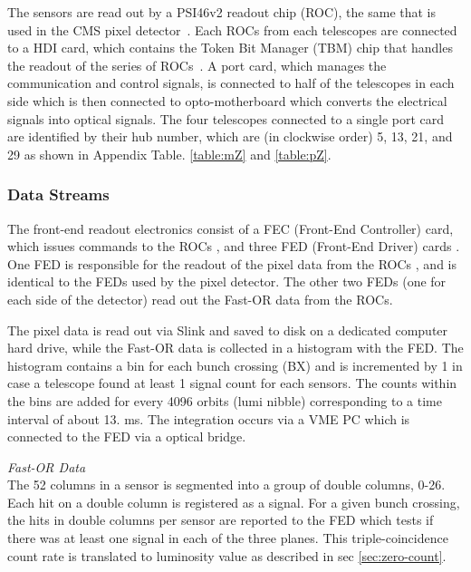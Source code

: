 The sensors are read out by a PSI46v2 readout chip (ROC), the same that is used in the CMS pixel detector~\cite{Kastli:2005jj, ROCManual, Barbero:467141}. Each ROCs from each telescopes are connected to a HDI card, which contains the Token Bit Manager (TBM) chip that handles the readout of the series of ROCs~\cite{BartzTBM}. A port card, which manages the communication and control signals, is connected to half of the telescopes in each side which is then connected to opto-motherboard which converts the electrical signals into optical signals. The four telescopes connected to a single port card are identified by their hub number, which are (in clockwise order) 5, 13, 21, and 29 as shown in Appendix Table. \ref{table:mZ} and \ref{table:pZ}.






\subsubsection {Data Streams}

The front-end readout electronics consist of a FEC (Front-End Controller) card, which issues
commands to the ROCs \cite{Allkofer:2007ek}, and three FED (Front-End Driver) cards \cite{Pernicka:1091743}. One FED is responsible for the readout of the pixel data from the ROCs , and is identical to the FEDs used by the pixel detector. The other two FEDs (one for each side of the detector) read out the Fast-OR data from the ROCs.

The pixel data \cite{Barbero:467141} is read out via Slink and saved to disk on a dedicated computer hard drive, while the Fast-OR data is collected in a histogram with the FED. The histogram contains a bin for each bunch crossing (BX) and is incremented by 1 in case a telescope found at least 1 signal count for each sensors. The counts within the bins are added for every 4096 orbits (lumi nibble) corresponding to a time interval of about 13. ms. The integration occurs via a VME PC which is connected to the FED via a optical bridge.



\noindent
\textit{Fast-OR Data} \\
The 52 columns in a sensor is segmented into a group of double columns, 0-26. Each hit on a double column is registered as a signal. For a given bunch crossing, the hits in double columns per sensor are reported to the FED which tests if there was at least one signal in each of the three planes. This triple-coincidence count rate is translated to luminosity value as described in sec \ref{sec:zero-count}.


